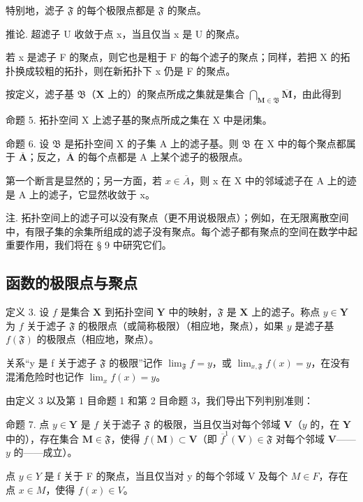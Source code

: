 特别地，滤子 \(\mathfrak{F}\) 的每个极限点都是 \(\mathfrak{F}\) 的聚点。

推论. 超滤子 U 收敛于点 x，当且仅当 x 是 U 的聚点。

若 x 是滤子 F 的聚点，则它也是粗于 F 的每个滤子的聚点；同样，若把 X 的拓扑换成较粗的拓扑，则在新拓扑下 x 仍是 F 的聚点。

按定义，滤子基 \(\mathfrak{B}\)（\(\mathbf{X}\) 上的）的聚点所成之集就是集合 \(\bigcap_{\mathbf{M} \in \mathfrak{B}} \overline{\mathbf{M}}\)，由此得到

命题 5. 拓扑空间 X 上滤子基的聚点所成之集在 X 中是闭集。

命题 6. 设 \(\mathfrak{B}\) 是拓扑空间 X 的子集 A 上的滤子基。则 \(\mathfrak{B}\) 在 X 中的每个聚点都属于 \(\overline{\mathbf{A}}\)；反之，\(\overline{\mathbf{A}}\) 的每个点都是 A 上某个滤子的极限点。

第一个断言是显然的；另一方面，若 \(x \in \overline{A}\)，则 x 在 X 中的邻域滤子在 A 上的迹是 A 上的滤子，它显然收敛于 x。

注. 拓扑空间上的滤子可以没有聚点（更不用说极限点）；例如，在无限离散空间中，有限子集的余集所组成的滤子没有聚点。每个滤子都有聚点的空间在数学中起重要作用，我们将在 § 9 中研究它们。

\subsection{函数的极限点与聚点}

定义 3. 设 \(f\) 是集合 \(\mathbf{X}\) 到拓扑空间 \(\mathbf{Y}\) 中的映射，\(\mathfrak{F}\) 是 \(\mathbf{X}\) 上的滤子。称点 \(y \in \mathbf{Y}\) 为 \(f\) 关于滤子 \(\mathfrak{F}\) 的极限点（或简称极限）（相应地，聚点），如果 \(y\) 是滤子基 \(f(\mathfrak{F})\) 的极限点（相应地，聚点）。

关系“y 是 f 关于滤子 \(\mathfrak{F}\) 的极限”记作 \(\lim_{\mathfrak{F}} f = y\)，或 \(\lim_{x, \mathfrak{F}} f(x) = y\)，在没有混淆危险时也记作 \(\lim_{x} f(x) = y\)。

由定义 3 以及第 1 目命题 1 和第 2 目命题 3，我们导出下列判别准则：

命题 7. 点 \(y \in \mathbf{Y}\) 是 \(f\) 关于滤子 \(\mathfrak{F}\) 的极限，当且仅当对每个邻域 \(\mathbf{V}\)（\(y\) 的，在 \(\mathbf{Y}\) 中的），存在集合 \(\mathbf{M} \in \mathfrak{F}\)，使得 \(f(\mathbf{M}) \subset \mathbf{V}\)（即 \(\overline{f}^{1}(\mathbf{V}) \in \mathfrak{F}\) 对每个邻域 \(\mathbf{V}\)——\(y\) 的——成立）。

点 \(y \in Y\) 是 f 关于 F 的聚点，当且仅当对 y 的每个邻域 V 及每个 \(M \in F\)，存在点 \(x \in M\)，使得 \(f(x) \in V\)。

